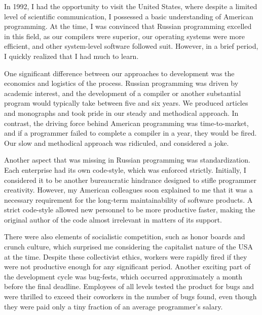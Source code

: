 
\cleardoublepage
{}

In 1992, I had the opportunity to visit the United States, where despite a limited level of scientific communication, I possessed a basic understanding of American programming. At the time, I was convinced that Russian programming excelled in this field, as our compilers were superior, our operating systems were more efficient, and other system-level software followed suit. However, in a brief period, I quickly realized that I had much to learn.

One significant difference between our approaches to development was the economics and logistics of the process. Russian programming was driven by academic interest, and the development of a compiler or another substantial program would typically take between five and six years. We produced articles and monographs and took pride in our steady and methodical approach. In contrast, the driving force behind American programming was time-to-market, and if a programmer failed to complete a compiler in a year, they would be fired. Our slow and methodical approach was ridiculed, and considered a joke.

Another aspect that was missing in Russian programming was standardization. Each enterprise had its own code-style, which was enforced strictly. Initially, I considered it to be another bureaucratic hindrance designed to stifle programmer creativity. However, my American colleagues soon explained to me that it was a necessary requirement for the long-term maintainability of software products. A strict code-style allowed new personnel to be more productive faster, making the original author of the code almost irrelevant in matters of its support.

There were also elements of socialistic competition, such as honor boards and crunch culture, which surprised me considering the capitalist nature of the USA at the time. Despite these collectivist ethics, workers were rapidly fired if they were not productive enough for any significant period. Another exciting part of the development cycle was bug-fests, which occurred approximately a month before the final deadline. Employees of all levels tested the product for bugs and were thrilled to exceed their coworkers in the number of bugs found, even though they were paid only a tiny fraction of an average programmer's salary.


